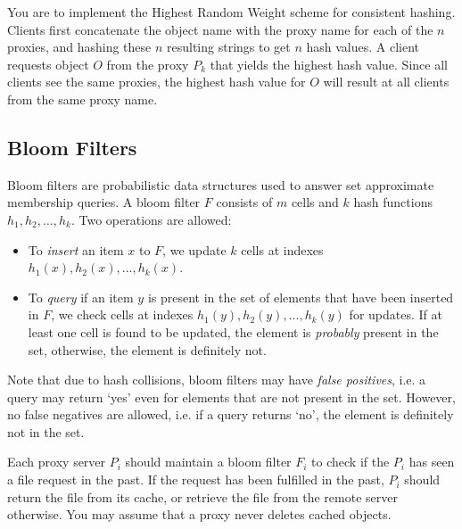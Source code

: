 \documentclass[11pt]{article}
\begin{document}
You are to implement the Highest Random Weight scheme for consistent hashing.
Clients first concatenate the object name with the proxy name for each of the
$n$ proxies, and hashing these $n$ resulting strings to get $n$ hash values.
A client requests object $O$ from the proxy $P_k$ that yields the highest
hash value. Since all clients see the same proxies, the highest hash value
for $O$ will result at all clients from the same proxy name.

\subsection{Bloom Filters}
Bloom filters are probabilistic data structures used to answer set approximate membership queries.
A bloom filter $F$ consists of $m$ cells and $k$ hash functions $h_1, h_2, \ldots, h_k$.
Two operations are allowed:
\begin{itemize}
\item To \emph{insert} an item $x$ to $F$, we update $k$ cells at indexes $h_1(x), h_2(x), \ldots, h_k(x)$.
\item To \emph{query} if an item $y$ is present in the set of elements that have been inserted in $F$, we 
check cells at indexes $h_1(y), h_2(y), \ldots, h_k(y)$ for updates. If at least one cell is found to be updated, 
the element is \textit{probably} present in the set, otherwise, the element is definitely not.
\end{itemize}

Note that due to hash collisions, bloom filters may have \textit{false positives}, i.e.
a query may return `yes' even for elements that are not present in the set. However, no false negatives
are allowed, i.e. if a query returns `no', the element is definitely not in the set.

Each proxy server $P_i$ should maintain a bloom filter $F_i$ to check if the $P_i$ has seen a file request in the past. If the request has been fulfilled in the past, $P_i$ should return the file from its cache, or retrieve the file from the remote server otherwise. You may assume that a proxy never deletes cached objects.

\end{document}
